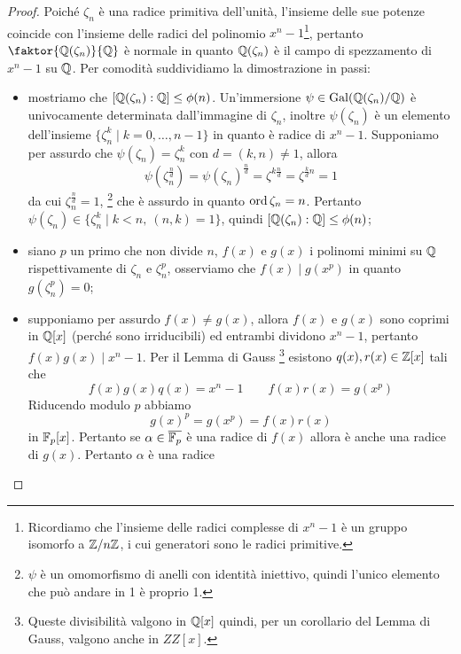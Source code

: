 \documentclass[11pt]{scrartcl}
\begin{document}
\begin{proof}
    Poiché $\zeta_n$ è una radice primitiva dell'unità, l'insieme delle sue 
    potenze coincide con l'insieme delle radici del polinomio $x^n - 1$\footnote{
        Ricordiamo che l'insieme delle radici complesse di $x^n -1$ è un gruppo 
        isomorfo a ${\mathbb Z}/n{\mathbb Z}$, i cui generatori sono le radici primitive.
    },
    pertanto $\faktor{\QQ(\zeta_n)}{\QQ}$ è normale in quanto $\mathbb Q(\zeta_n)$
    è il campo di spezzamento di $x^n - 1$ su $\mathbb Q$. Per comodità suddividiamo 
    la dimostrazione in passi:
    \begin{itemize}
        \item mostriamo che $[\mathbb Q(\zeta_n):\mathbb Q] \leq \phi(n)$. Un'immersione
        $\psi \in \operatorname{Gal}(\mathbb Q(\zeta_n)/\mathbb Q)$ è univocamente determinata dall'immagine
        di $\zeta_n$, inoltre $\psi(\zeta_n)$ è un elemento dell'insieme 
        $\{\zeta_n^k\mid k = 0, \ldots, n - 1\}$ in quanto è radice di $x^n - 1$.
        Supponiamo per assurdo che $\psi(\zeta_n) = \zeta_n^k$ con $d = (k, n)\neq 1$, 
        allora
        \[
            \psi(\zeta_n^{\frac n d}) = \psi(\zeta_n)^{\frac n d} = \zeta^{k\frac n d} = 
            \zeta^{\frac k d n} = 1
        \]
        da cui $\zeta_n^{\frac n d} = 1$,
        \footnote{$\psi$ è un omomorfismo di anelli con identità iniettivo, quindi l'unico elemento che può andare in 1 è proprio 1.}
        che è assurdo in quanto $\operatorname{ord} \zeta_n = n$.
        Pertanto $\psi(\zeta_n) \in \{\zeta_n^k\mid k < n,~(n, k) = 1\}$, quindi
        $[\mathbb Q(\zeta_n):\mathbb Q] \leq \phi(n)$;
        \item siano $p$ un primo che non divide $n$, $f(x)$ e $g(x)$ i polinomi 
        minimi su $\mathbb Q$ rispettivamente di $\zeta_n$ e $\zeta_n^p$, osserviamo
        che $f(x) \mid g(x^p)$ in quanto $g(\zeta_n^p) = 0$;
        \item supponiamo per assurdo $f(x) \neq g(x)$, allora $f(x)$ e $g(x)$
        sono coprimi in $\mathbb Q[x]$ (perché sono irriducibili) ed entrambi dividono $x^n - 1$, pertanto $f(x)g(x) \mid x^n -1$.
        Per il Lemma di Gauss
        \footnote{Queste divisibilità valgono in $\mathbb Q[x]$ quindi, per un corollario del Lemma di Gauss, valgono anche in $ZZ[x]$.}
        esistono $q(x), r(x) \in \mathbb Z[x]$ tali che 
        \[
            f(x)g(x)q(x) = x^n - 1\qquad f(x)r(x) = g(x^p)
        \]
        Riducendo modulo $p$ abbiamo 
        \[
            g(x)^p = g(x^p) = f(x)r(x)
        \]
        in $\mathbb F_p[x]$. Pertanto se $\alpha \in \overline{\mathbb F_p}$ è una radice di $f(x)$
        allora è anche una radice di $g(x)$. Pertanto $\alpha$ è una radice

\end{itemize}
\end{proof}
\end{document}
